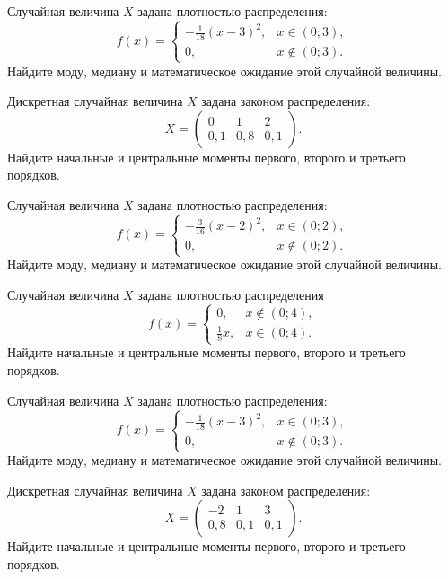 

\z Случайная величина $X$ задана плотностью распределения: $$f(x) = \begin{cases} -\frac{1}{18}(x-3)^2, & x \in (0; 3), \\ 0, & x \not\in (0; 3). \end{cases}$$ Найдите моду, медиану и математическое ожидание этой случайной величины.


\vfill

\z Дискретная случайная величина $X$ задана законом распределения: $$ X = \left(\begin{array}{rrr}0 & 1 & 2\\0{,}1 & 0{,}8 & 0{,}1\end{array}\right).$$ Найдите начальные и центральные моменты первого, второго и третьего порядков.
 

\vfill

\newpage\setcounter{zad}{0}

\z Случайная величина $X$ задана плотностью распределения: $$f(x) = \begin{cases} -\frac{3}{16}(x-2)^2, & x \in (0; 2), \\ 0, & x \not\in (0; 2). \end{cases}$$ Найдите моду, медиану и математическое ожидание этой случайной величины.


\vfill

\z Случайная величина $X$ задана плотностью распределения $$f(x) = \begin{cases}0, & x\not\in(0; 4), \\ \frac{1}{8}x, & x\in(0; 4).\end{cases}$$ Найдите начальные и центральные моменты первого, второго и третьего порядков.
 

\vfill

\newpage\setcounter{zad}{0}

\z Случайная величина $X$ задана плотностью распределения: $$f(x) = \begin{cases} -\frac{1}{18}(x-3)^2, & x \in (0; 3), \\ 0, & x \not\in (0; 3). \end{cases}$$ Найдите моду, медиану и математическое ожидание этой случайной величины.


\vfill

\z Дискретная случайная величина $X$ задана законом распределения: $$ X = \left(\begin{array}{rrr}-2 & 1 & 3\\0{,}8 & 0{,}1 & 0{,}1\end{array}\right).$$ Найдите начальные и центральные моменты первого, второго и третьего порядков.
 


